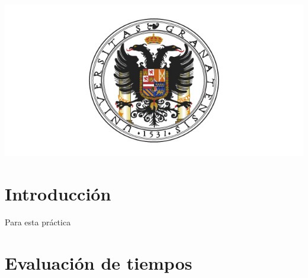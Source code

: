 \includegraphics[width=1\linewidth]{ugr}

\newpage %

\tableofcontents %



\newpage


\section*{Introducción}

Para esta práctica 

\section{Evaluación de tiempos}

